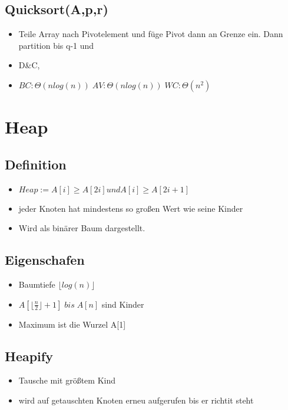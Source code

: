 \documentclass{article}
\begin{document}
\subsection{Quicksort(A,p,r)}
\begin{itemize}
\item Teile Array nach Pivotelement und füge Pivot dann an Grenze ein. Dann partition bis q-1 und 
\item D\&C, 
\item $BC: \Theta(nlog(n))\; AV:\Theta(nlog(n))\; WC: \Theta(n^2)\;$
\end{itemize}

\section{Heap}
\subsection{Definition}

\begin{itemize}
\item $ Heap := A[i] \geq A[2i] und A[i] \geq A[2i+1]$ \\
\item jeder Knoten hat mindestens so großen Wert wie seine Kinder \\
\item Wird als binärer Baum dargestellt. \newline
\end{itemize}

\subsection{Eigenschafen}
\begin{itemize}
\item Baumtiefe $\lfloor log(n)\rfloor$
\item $A[\lfloor \frac{n}{2} \rfloor +1] \; bis \; A[n]$ sind Kinder
\item Maximum ist die Wurzel A[1]
\end{itemize}
\subsection{Heapify}
\begin{itemize}
\item Tausche mit größtem Kind
\item wird auf getauschten Knoten erneu aufgerufen bis er richtit steht
\end{itemize}
\end{document}
